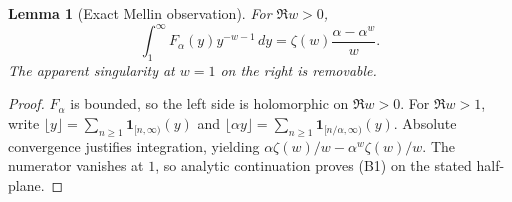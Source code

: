 \documentclass[11pt]{article}
\newtheorem{lemma}[theorem]{Lemma}
\begin{document}
\begin{lemma}[Exact Mellin observation]\label{lem:NB-mellin}
For $\Re w>0$,
\[
 \int_1^\infty F_\alpha(y)y^{-w-1}\,dy
       =\zeta(w)\frac{\alpha-\alpha^w}{w}.\tag{B1}
\]
The apparent singularity at $w=1$ on the right is removable.
\end{lemma}
\begin{proof}
$F_\alpha$ is bounded, so the left side is holomorphic on $\Re w>0$.
For $\Re w>1$, write
$\lfloor y\rfloor=\sum_{n\geq1}\mathbf1_{[n,\infty)}(y)$ and
$\lfloor\alpha y\rfloor=\sum_{n\geq1}\mathbf1_{[n/\alpha,\infty)}(y)$.
Absolute convergence justifies integration, yielding
$\alpha\zeta(w)/w-\alpha^w\zeta(w)/w$. The numerator vanishes at $1$,
so analytic continuation proves (B1) on the stated half-plane.
\end{proof}
\end{document}
